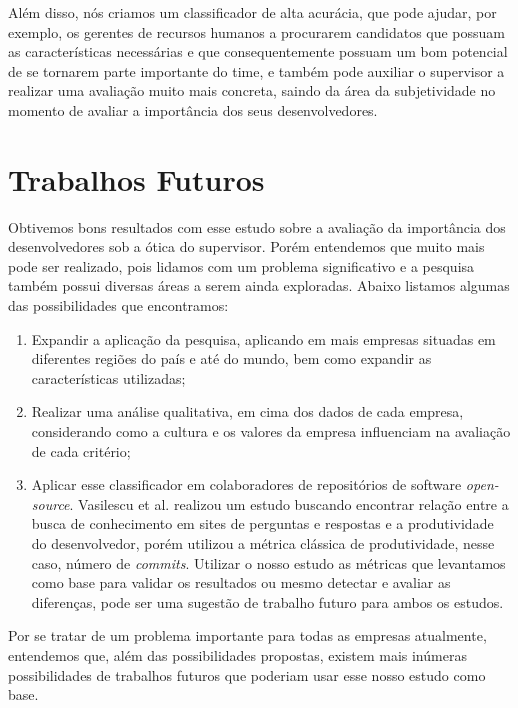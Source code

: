 Além disso, nós criamos um classificador de alta acurácia, que pode ajudar, por exemplo, os gerentes de recursos humanos a procurarem candidatos que possuam as características necessárias e que consequentemente possuam um bom potencial de se tornarem parte importante do time, e também pode auxiliar o supervisor a realizar uma avaliação muito mais concreta, saindo da área da subjetividade no momento de avaliar a importância dos seus desenvolvedores.


\section{Trabalhos Futuros}

Obtivemos bons resultados com esse estudo sobre a avaliação da importância dos desenvolvedores sob a ótica do supervisor. Porém entendemos que muito mais pode ser realizado, pois lidamos com um problema significativo e a pesquisa também possui diversas áreas a serem ainda exploradas. Abaixo listamos algumas das possibilidades que encontramos:
\begin{enumerate}
	\item Expandir a aplicação da pesquisa, aplicando em mais empresas situadas em diferentes regiões do país e até do mundo, bem como expandir as características utilizadas;
	\item Realizar uma análise qualitativa, em cima dos dados de cada empresa, considerando como a cultura e os valores da empresa influenciam na avaliação de cada critério;
	\item Aplicar esse classificador em colaboradores de repositórios de software \textit{open-source}. Vasilescu et al. \cite{Vasilescu2013} realizou um estudo buscando encontrar relação entre a busca de conhecimento em sites de perguntas e respostas e a produtividade do desenvolvedor, porém utilizou a métrica clássica de produtividade, nesse caso, número de \textit{commits}. Utilizar o nosso estudo as métricas que levantamos como base para validar os resultados ou mesmo detectar e avaliar as diferenças, pode ser uma sugestão de trabalho futuro para ambos os estudos.
\end{enumerate}

Por se tratar de um problema importante para todas as empresas atualmente, entendemos que, além das possibilidades propostas, existem mais inúmeras possibilidades de trabalhos futuros que poderiam usar esse nosso estudo como base.

